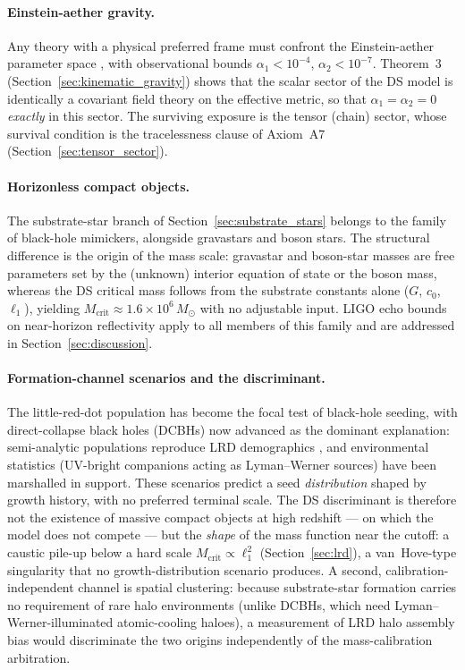 \documentclass[11pt,a4paper]{article}
\theoremstyle{plain}
\theoremstyle{remark}
\begin{document}
\paragraph{Einstein-aether gravity.} Any theory with a physical preferred frame must confront the Einstein-aether parameter space \cite{jacobson_ae, will_ppn}, with observational bounds $\alpha_1 < 10^{-4}$, $\alpha_2 < 10^{-7}$. Theorem~3 (Section~\ref{sec:kinematic_gravity}) shows that the scalar sector of the DS model is identically a covariant field theory on the effective metric, so that $\alpha_1 = \alpha_2 = 0$ \emph{exactly} in this sector. The surviving exposure is the tensor (chain) sector, whose survival condition is the tracelessness clause of Axiom~A7 (Section~\ref{sec:tensor_sector}).

\paragraph{Horizonless compact objects.} The substrate-star branch of Section~\ref{sec:substrate_stars} belongs to the family of black-hole mimickers, alongside gravastars \cite{mazur2001, mazur2023} and boson stars. The structural difference is the origin of the mass scale: gravastar and boson-star masses are free parameters set by the (unknown) interior equation of state or the boson mass, whereas the DS critical mass follows from the substrate constants alone ($G$, $c_0$, $\ell_1$), yielding $M_{\text{crit}} \approx 1.6\times10^{6}\,M_\odot$ with no adjustable input. LIGO echo bounds on near-horizon reflectivity \cite{GW170817} apply to all members of this family and are addressed in Section~\ref{sec:discussion}.

\paragraph{Formation-channel scenarios and the discriminant.} The little-red-dot population has become the focal test of black-hole seeding, with direct-collapse black holes (DCBHs) now advanced as the dominant explanation: semi-analytic populations reproduce LRD demographics \cite{jeon2026}, and environmental statistics (UV-bright companions acting as Lyman--Werner sources) have been marshalled in support. These scenarios predict a seed \emph{distribution} shaped by growth history, with no preferred terminal scale. The DS discriminant is therefore not the existence of massive compact objects at high redshift --- on which the model does not compete --- but the \emph{shape} of the mass function near the cutoff: a caustic pile-up below a hard scale $M_{\text{crit}} \propto \ell_1^2$ (Section~\ref{sec:lrd}), a van~Hove-type singularity that no growth-distribution scenario produces. A second, calibration-independent channel is spatial clustering: because substrate-star formation carries no requirement of rare halo environments (unlike DCBHs, which need Lyman--Werner-illuminated atomic-cooling haloes), a measurement of LRD halo assembly bias would discriminate the two origins independently of the mass-calibration arbitration.
\end{document}
